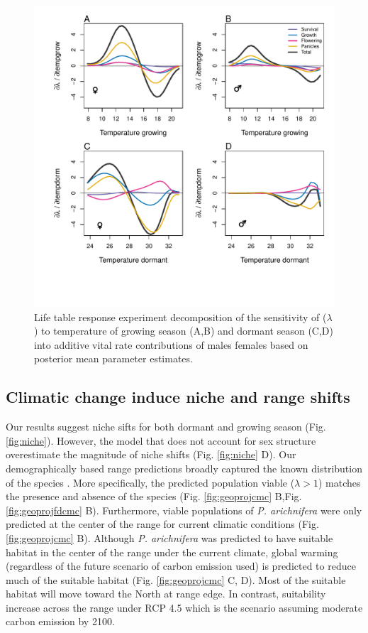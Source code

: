 \documentclass[12pt]{article}
\begin{document}
\begin{figure}[H]
  \begin{center}
    \includegraphics[width=0.95\linewidth]{Figures/LTRE_Temperature.pdf}
  \caption{Life table response experiment decomposition of the sensitivity of ($\lambda$) to  temperature of growing season (A,B) and dormant season (C,D) into additive vital rate contributions of males females based on posterior mean parameter estimates.}
  \label{fig:LTRETemp}
  \end{center}
\end{figure}

\subsection*{Climatic change induce niche and range shifts}
Our results suggest niche sifts for both dormant and growing season (Fig. \ref{fig:niche}). 
However, the model that does not account for sex structure overestimate the magnitude of niche shifts (Fig. \ref{fig:niche} D). 
Our demographically based range predictions broadly captured the known distribution of the species . 
More specifically, the predicted population viable ($\lambda>1$) matches the presence and absence of the species (Fig. \ref{fig:geoprojcmc} B,Fig. \ref{fig:geoprojfdcmc} B). 
Furthermore, viable populations of \emph{P. arichnifera} were only predicted at the center of the range for current climatic conditions (Fig. \ref{fig:geoprojcmc} B).
Although \emph{P. arichnifera} was predicted to have suitable habitat in the center of the range under the current climate, global  warming (regardless of the future scenario of carbon emission used) is predicted to reduce much of the suitable habitat (Fig. \ref{fig:geoprojcmc} C, D). 
Most of the suitable  habitat will move toward the North at range edge.  
In contrast, suitability increase across the range under RCP 4.5 which is the scenario assuming moderate carbon emission by 2100. 
\end{document}
